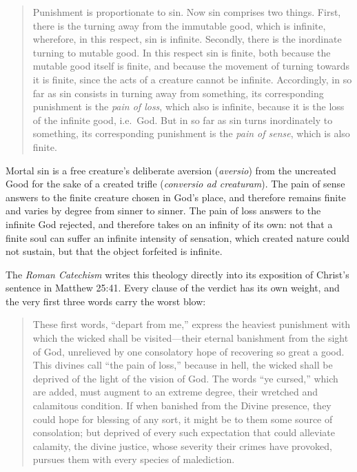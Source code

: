 \begin{quote}
Punishment is proportionate to sin. Now sin comprises two things. First, there is the turning away from the immutable good, which is infinite, wherefore, in this respect, sin is infinite. Secondly, there is the inordinate turning to mutable good. In this respect sin is finite, both because the mutable good itself is finite, and because the movement of turning towards it is finite, since the acts of a creature cannot be infinite. Accordingly, in so far as sin consists in turning away from something, its corresponding punishment is the \textit{pain of loss}, which also is infinite, because it is the loss of the infinite good, i.e.\ God. But in so far as sin turns inordinately to something, its corresponding punishment is the \textit{pain of sense}, which is also finite.
\end{quote}

Mortal sin is a free creature's deliberate aversion (\textit{aversio}) from the uncreated Good for the sake of a created trifle (\textit{conversio ad creaturam}). The pain of sense answers to the finite creature chosen in God's place, and therefore remains finite and varies by degree from sinner to sinner. The pain of loss answers to the infinite God rejected, and therefore takes on an infinity of its own: not that a finite soul can suffer an infinite intensity of sensation, which created nature could not sustain, but that the object forfeited is infinite.

The \textit{Roman Catechism} writes this theology directly into its exposition of Christ's sentence in Matthew 25:41. Every clause of the verdict has its own weight, and the very first three words carry the worst blow:

\begin{quote}
These first words, ``depart from me,'' express the heaviest punishment with which the wicked shall be visited---their eternal banishment from the sight of God, unrelieved by one consolatory hope of recovering so great a good. This divines call ``the pain of loss,'' because in hell, the wicked shall be deprived of the light of the vision of God. The words ``ye cursed,'' which are added, must augment to an extreme degree, their wretched and calamitous condition. If when banished from the Divine presence, they could hope for blessing of any sort, it might be to them some source of consolation; but deprived of every such expectation that could alleviate calamity, the divine justice, whose severity their crimes have provoked, pursues them with every species of malediction.
\end{quote}

